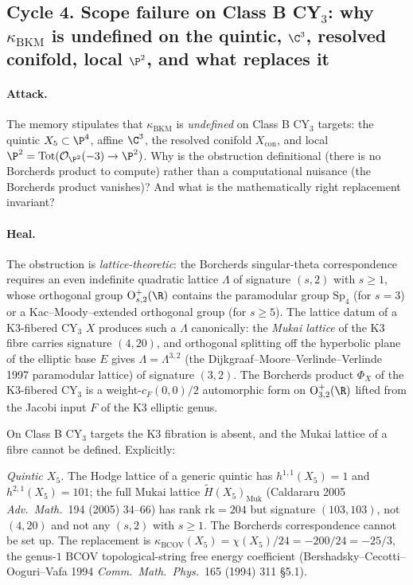 \subsection*{Cycle 4. Scope failure on Class B CY$_3$: why
  $\kappa_{\mathrm{BKM}}$ is undefined on the quintic, $\C^3$,
  resolved conifold, local $\P^2$, and what replaces it}

\paragraph{Attack.} The memory stipulates that
$\kappa_{\mathrm{BKM}}$ is \emph{undefined} on Class B CY$_3$
targets: the quintic $X_5 \subset \P^4$, affine $\C^3$, the
resolved conifold $X_{\mathrm{con}}$, and local $\P^2 =
\mathrm{Tot}(\mathcal{O}_{\P^2}(-3) \to \P^2)$. Why is the
obstruction definitional (there is no Borcherds product to
compute) rather than a computational nuisance (the Borcherds
product vanishes)? And what is the mathematically right
replacement invariant?

\paragraph{Heal.} The obstruction is \emph{lattice-theoretic}:
the Borcherds singular-theta correspondence requires an even
indefinite quadratic lattice $\Lambda$ of signature $(s, 2)$ with
$s \geq 1$, whose orthogonal group
$\mathrm{O}^+_{s, 2}(\R)$ contains the paramodular group
$\mathrm{Sp}_4$ (for $s = 3$) or a Kac--Moody--extended
orthogonal group (for $s \geq 5$). The lattice datum of a
K3-fibered CY$_3$ $X$ produces such a $\Lambda$ canonically: the
\emph{Mukai lattice} of the K3 fibre carries signature $(4, 20)$,
and orthogonal splitting off the hyperbolic plane of the
elliptic base $E$ gives $\Lambda = \Lambda^{3, 2}$ (the
Dijkgraaf--Moore--Verlinde--Verlinde 1997 paramodular lattice)
of signature $(3, 2)$. The Borcherds product $\Phi_X$ of the
K3-fibered CY$_3$ is a weight-$c_F(0, 0)/2$ automorphic form on
$\mathrm{O}^+_{3, 2}(\R)$ lifted from the Jacobi input $F$ of
the K3 elliptic genus.

On Class B CY$_3$ targets the K3 fibration is absent, and the
Mukai lattice of a fibre cannot be defined. Explicitly:

\emph{Quintic $X_5$.} The Hodge lattice of a generic quintic has
$h^{1, 1}(X_5) = 1$ and $h^{2, 1}(X_5) = 101$; the full Mukai
lattice $\widetilde{H}(X_5)_{\mathrm{Muk}}$ (Caldararu 2005
\emph{Adv.\ Math.}~194 (2005) 34--66) has rank $\mathrm{rk} =
204$ but signature $(103, 103)$, not $(4, 20)$ and not any
$(s, 2)$ with $s \geq 1$. The Borcherds correspondence cannot
be set up. The replacement is $\kappa_{\mathrm{BCOV}}(X_5) =
\chi(X_5)/24 = -200/24 = -25/3$, the genus-$1$ BCOV
topological-string free energy coefficient (Bershadsky--Cecotti--
Ooguri--Vafa 1994 \emph{Comm.\ Math.\ Phys.}~165 (1994) 311
\S 5.1).


